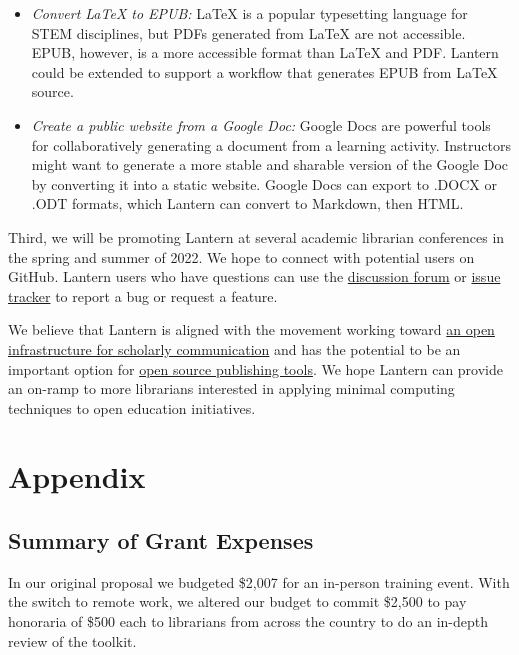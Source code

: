 \documentclass{book}
\begin{document}
\begin{itemize}
\item
  \emph{Convert LaTeX to EPUB:} LaTeX is a popular typesetting language for
  STEM disciplines, but PDFs generated from LaTeX are not accessible. EPUB,
  however, is a more accessible format than LaTeX and PDF. Lantern could be
  extended to support a workflow that generates EPUB from LaTeX source.
\item
  \emph{Create a public website from a Google Doc:} Google Docs are powerful
  tools for collaboratively generating a document from a learning activity.
  Instructors might want to generate a more stable and sharable version of the
  Google Doc by converting it into a static website. Google Docs can export to
  .DOCX or .ODT formats, which Lantern can convert to Markdown, then HTML.
\end{itemize}

Third, we will be promoting Lantern at several academic librarian conferences
in the spring and summer of 2022. We hope to connect with potential users on
GitHub. Lantern users who have questions can use the
\href{https://github.com/nulib-oer/lantern/discussions}{discussion forum} or
\href{https://github.com/nulib-oer/lantern/issues}{issue tracker} to report a
bug or request a feature.

We believe that Lantern is aligned with the movement working toward
\href{https://investinopen.org/about/}{an open infrastructure for scholarly
communication} and has the potential to be an important option for
\href{https://mindthegap.pubpub.org/}{open source publishing tools}. We hope
Lantern can provide an on-ramp to more librarians interested in applying
minimal computing techniques to open education initiatives.

\hypertarget{appendix}{%
\chapter{Appendix}\label{appendix}}

\hypertarget{summary-of-grant-expenses}{%
\section{Summary of Grant Expenses}\label{summary-of-grant-expenses}}

In our original proposal we budgeted \$2,007 for an in-person training event.
With the switch to remote work, we altered our budget to commit \$2,500 to pay
honoraria of \$500 each to librarians from across the country to do an
in-depth review of the toolkit.
\end{document}
